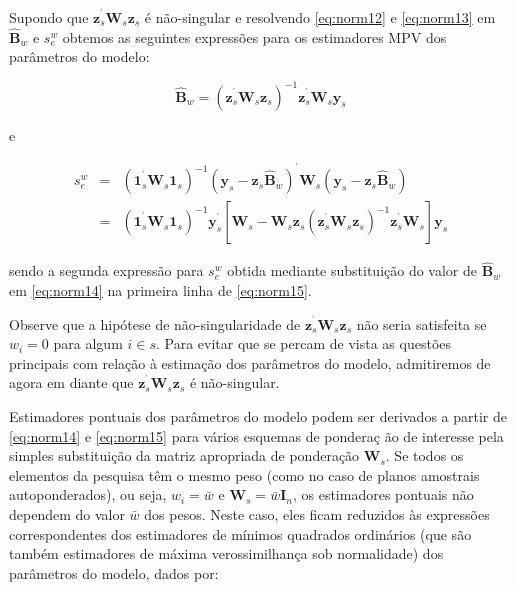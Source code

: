 \documentclass[]{book}
\theoremstyle{definition}
\theoremstyle{definition}
\theoremstyle{definition}
\theoremstyle{remark}
\begin{document}
Supondo que \(\mathbf{z}_{s}^{^{\prime }}\mathbf{W}_{s}\mathbf{z}_{s}\)
é não-singular e resolvendo \eqref{eq:norm12} e \eqref{eq:norm13} em
\(\mathbf{\hat{B} }_{w}\) e \(s_{e}^{w}\) obtemos as seguintes
expressões para os estimadores MPV dos parâmetros do modelo:

\begin{equation}
\widehat{\mathbf{B}}_{w}=\left( \mathbf{z}_{s}^{^{\prime }}\mathbf{W}_{s}
\mathbf{z}_{s}\right) ^{-1}\mathbf{z}_{s}^{^{\prime }}\mathbf{W}_{s}\mathbf{y
}_{s}  \label{eq:norm14}
\end{equation}

e

\begin{eqnarray}
s_{e}^{w} &=&\left( \mathbf{1}_{s}^{^{\prime }}\mathbf{W}_{s}\mathbf{1}
_{s}\right) ^{-1}\left( \mathbf{y}_{s}-\mathbf{z}_{s}\widehat{\mathbf{B}}
_{w}\right) ^{^{\prime }}\mathbf{W}_{s}\left( \mathbf{y}_{s}-\mathbf{z}_{s}
\widehat{\mathbf{B}}_{w}\right)  \label{eq:norm15} \\
&=&\left( \mathbf{1}_{s}^{^{\prime }}\mathbf{W}_{s}\mathbf{1}_{s}\right)
^{-1}\mathbf{y}_{s}^{^{\prime }}\left[ \mathbf{W}_{s}-\mathbf{W}_{s}\mathbf{z
}_{s}\left( \mathbf{z}_{s}^{^{\prime }}\mathbf{W}_{s}\mathbf{z}_{s}\right)
^{-1}\mathbf{z}_{s}^{^{\prime }}\mathbf{W}_{s}\right] \mathbf{y}_{s} 
\nonumber
\end{eqnarray}

sendo a segunda expressão para \(s_{e}^{w}\) obtida mediante
substituição do valor de \(\widehat{\mathbf{B}}_{w}\) em \eqref{eq:norm14}
na primeira linha de \eqref{eq:norm15}.

Observe que a hipótese de não-singularidade de
\(\mathbf{z} _{s}^{^{\prime }}\mathbf{W}_{s}\mathbf{z}_{s}\) não seria
satisfeita se \(w_{i}=0\) para algum \(i\in s\). Para evitar que se
percam de vista as questões principais com relação à estimação dos
parâmetros do modelo, admitiremos de agora em diante que
\(\mathbf{z} _{s}^{^{\prime }}\mathbf{W}_{s}\mathbf{z}_{s}\) é
não-singular.

Estimadores pontuais dos parâmetros do modelo podem ser derivados a
partir de \eqref{eq:norm14} e \eqref{eq:norm15} para vários esquemas de
pondera\c{c
}ão de interesse pela simples substituição da matriz apropriada de
ponderação \(\mathbf{W}_{s}\). Se todos os elementos da pesquisa têm o
mesmo peso (como no caso de planos amostrais autoponderados), ou seja,
\(w_{i}=\bar{w}\) e \(\mathbf{W}_{s}=\bar{w}\mathbf{I}_{n}\), os
estimadores pontuais não dependem do valor \(\bar{w}\) dos pesos. Neste
caso, eles ficam reduzidos às expressões correspondentes dos estimadores
de mínimos quadrados ordinários (que são também estimadores de máxima
verossimilhança sob normalidade) dos parâmetros do modelo, dados por:
\end{document}
